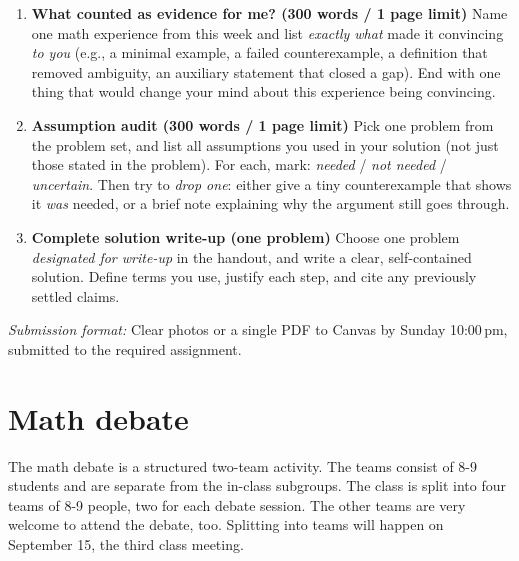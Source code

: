 \documentclass[oneside,11pt]{amsart}
\begin{document}
\begin{enumerate}[(1)]
  \item \textbf{What counted as evidence for me? (300 words / 1 page limit)}
	Name one math experience from this week
	and list \emph{exactly what} made it convincing \emph{to
	you} (e.g., a minimal example, a failed counterexample, a
	definition that removed ambiguity, an auxiliary statement
	that closed a gap). 
	End with one thing that would change your mind about 
	this experience being convincing.

  \item \textbf{Assumption audit (300 words / 1 page limit)}
	Pick one problem from the problem set, and list all
	assumptions you used in your solution
	(not just those stated in the problem). For each, mark:
	\emph{needed} / \emph{not needed} / \emph{uncertain}. Then
	try to \emph{drop one}: either give a tiny counterexample
	that shows it \emph{was} needed, or a brief note
	explaining why the argument still goes through.

  \item \textbf{Complete solution write-up (one problem)}
  Choose one problem \emph{designated for write-up} in the handout, and write a clear, self-contained solution. Define terms you use, justify each step, and cite any previously settled claims.
\end{enumerate}
\emph{Submission format:} Clear photos or a single PDF to Canvas by Sunday 10:00\,pm, submitted to the required assignment.

\section{Math debate}

The math debate is a structured two-team activity.
The teams consist of 8-9 students and are separate from the 
in-class subgroups. The class is split into four teams of 8-9 people,
two for each debate session.
The other teams are very welcome to attend the debate, too.
Splitting into teams will happen on September 15, the third class meeting.
\end{document}

